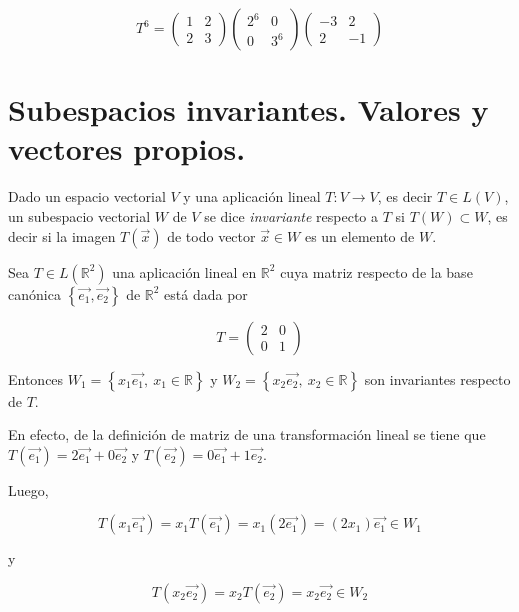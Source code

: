 \bigskip

$$T^6=\left(\begin{array}{cc}  1 & 2  \\ 2 &  3
\end{array}
 \right) \left(\begin{array}{cc}  2^6 & 0  \\ 0 &  3^6
\end{array}
 \right) \left(\begin{array}{cc}  -3 & 2  \\ 2 &  -1
\end{array}
 \right) $$

\bigskip

\section{Subespacios invariantes. Valores y vectores propios.}
\label{Subespacios invariantes}


Dado un espacio vectorial $V$ y una aplicación lineal  $T: V \rightarrow V$, es decir $T \in L(V)$, un subespacio vectorial $W$ de $V$ se dice  \textit{invariante}   respecto a $T$ si $T(W)\subset W$, es decir si la imagen $T(\vec{x})$ de todo vector  $\vec{x}\in W$ es un elemento de $W$.

\bigskip

\begin{example}

Sea $T\in L(\mathbb{R}^2)$ una aplicación lineal en $\mathbb{R}^2$ cuya matriz respecto de la base canónica $\left\{\vec{e_1} , \vec{e_2}\right\}$ de $\mathbb{R}^2$ está dada por 


$$T=\left(\begin{array}{cc}  2 & 0  \\ 0 &  1
\end{array}
\right)$$

\bigskip

Entonces $W_1=\left\{x_1\vec{e_1} ,~ x_1\in \mathbb{R}\right\}$ y $W_2=\left\{x_2\vec{e_2} ,~ x_2\in \mathbb{R}\right\}$ son invariantes respecto de $T$. 


\bigskip

En efecto, de la definición de matriz de una transformación lineal se tiene que $T(\vec{e_1})=2 \vec{e_1} + 0 \vec{e_2}$ y $T(\vec{e_2})=0 \vec{e_1} + 1 \vec{e_2}$.

\bigskip
Luego, 

$$T(x_1\vec{e_1})=x_1T(\vec{e_1})=x_1(2\vec{e_1})=(2x_1)\vec{e_1}\in W_1$$

y

$$T(x_2\vec{e_2})=x_2T(\vec{e_2})=x_2\vec{e_2}\in W_2$$

\end{example}
\bigskip

